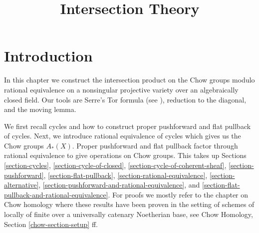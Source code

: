 

%


\title{Intersection Theory}


\maketitle

\label{section-phantom}

\tableofcontents


\section{Introduction}
\label{section-introduction}

\noindent
In this chapter we construct the intersection product on the Chow groups
modulo rational equivalence on a nonsingular projective variety over an
algebraically closed field. Our tools are Serre's Tor formula
(see \cite[Chapter V]{Serre_algebre_locale}), reduction to the diagonal,
and the moving lemma.

\medskip\noindent
We first recall cycles and how to construct proper pushforward and
flat pullback of cycles. Next, we introduce rational equivalence of cycles
which gives us the Chow groups $A_*(X)$. Proper pushforward and flat pullback
factor through rational equivalence to give operations on Chow groups.
This takes up Sections 
\ref{section-cycles},
\ref{section-cycle-of-closed},
\ref{section-cycle-of-coherent-sheaf},
\ref{section-pushforward},
\ref{section-flat-pullback},
\ref{section-rational-equivalence},
\ref{section-alternative},
\ref{section-pushforward-and-rational-equivalence}, and
\ref{section-flat-pullback-and-rational-equivalence}.
For proofs we mostly refer to the chapter on Chow homology
where these results have been proven in the setting of
schemes of locally of finite over a universally catenary Noetherian base, see
Chow Homology, Section \ref{chow-section-setup} ff.

